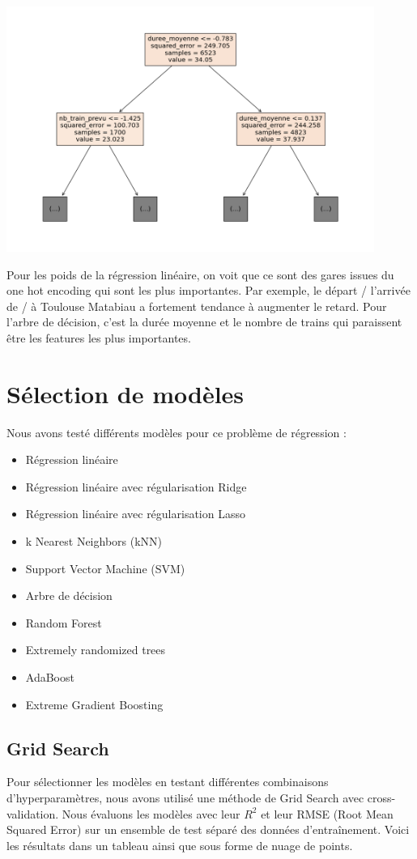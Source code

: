 \documentclass{article}
\begin{document}
\begin{center}
\includegraphics[width=12cm]{decision_tree.png}
\end{center}
Pour les poids de la régression linéaire, on voit que ce sont des gares issues du one hot encoding qui sont les plus importantes. Par exemple, le départ / l'arrivée de / à Toulouse Matabiau a fortement tendance à augmenter le retard.
Pour l'arbre de décision, c'est la durée moyenne et le nombre de trains qui paraissent être les features les plus importantes.

\section{Sélection de modèles}
Nous avons testé différents modèles pour ce problème de régression :
\begin{itemize}[label=\textbullet]
    \item Régression linéaire
    \item Régression linéaire avec régularisation Ridge
    \item Régression linéaire avec régularisation Lasso
    \item k Nearest Neighbors (kNN)
    \item Support Vector Machine (SVM)
    \item Arbre de décision
    \item Random Forest
    \item Extremely randomized trees
    \item AdaBoost
    \item Extreme Gradient Boosting
\end{itemize}

\subsection{Grid Search}
Pour sélectionner les modèles en testant différentes combinaisons d'hyperparamètres, nous avons utilisé une méthode de Grid Search avec cross-validation. Nous évaluons les modèles avec leur $R^2$ et leur RMSE (Root Mean Squared Error) sur un ensemble de test séparé des données d'entraînement. Voici les résultats dans un tableau ainsi que sous forme de nuage de points.
\end{document}
